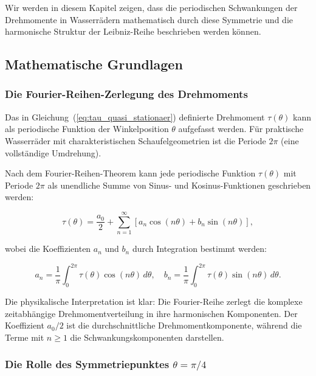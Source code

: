 \documentclass[a4paper,12pt]{article}
\theoremstyle{definition}
\begin{document}
Wir werden in diesem Kapitel zeigen, dass die periodischen Schwankungen der Drehmomente in Wasserrädern mathematisch durch diese Symmetrie und die harmonische Struktur der Leibniz-Reihe beschrieben werden können.

\subsection{Mathematische Grundlagen}

\subsubsection{Die Fourier-Reihen-Zerlegung des Drehmoments}

Das in Gleichung~(\ref{eq:tau_quasi_stationaer}) definierte Drehmoment $\tau(\theta)$ kann als periodische Funktion der Winkelposition $\theta$ aufgefasst werden. Für praktische Wasserräder mit charakteristischen Schaufelgeometrien ist die Periode $2\pi$ (eine vollständige Umdrehung). 

Nach dem Fourier-Reihen-Theorem kann jede periodische Funktion $\tau(\theta)$ mit Periode $2\pi$ als unendliche Summe von Sinus- und Kosinus-Funktionen geschrieben werden:

\begin{equation}
  \tau(\theta) = \frac{a_0}{2} + \sum_{n=1}^{\infty} \left[ a_n \cos(n\theta) + b_n \sin(n\theta) \right],
  \label{eq:fourier_drehmoment}
\end{equation}

\noindent
wobei die Koeffizienten $a_n$ und $b_n$ durch Integration bestimmt werden:

\begin{equation}
  a_n = \frac{1}{\pi} \int_0^{2\pi} \tau(\theta) \cos(n\theta) \, d\theta, \quad b_n = \frac{1}{\pi} \int_0^{2\pi} \tau(\theta) \sin(n\theta) \, d\theta.
  \label{eq:fourier_koeffizienten}
\end{equation}

Die physikalische Interpretation ist klar: Die Fourier-Reihe zerlegt die komplexe zeitabhängige Drehmomentverteilung in ihre harmonischen Komponenten. Der Koeffizient $a_0/2$ ist die durchschnittliche Drehmomentkomponente, während die Terme mit $n \geq 1$ die Schwankungskomponenten darstellen.

\subsubsection{Die Rolle des Symmetriepunktes $\theta = \pi/4$}
\end{document}
